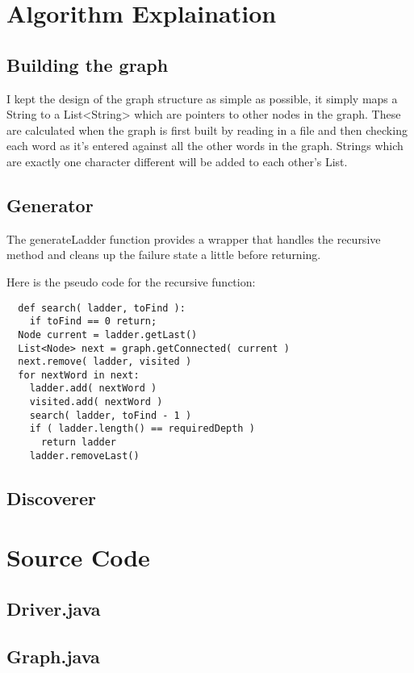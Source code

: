 \documentclass[12pt, titlepage, a4paper, twoside]{article}
\begin{document}
\section*{Algorithm Explaination}

\subsection*{Building the graph}
I kept the design of the graph structure as simple as possible, it simply maps
a String to a List<String> which are pointers to other nodes in the graph. These
are calculated when the graph is first built by reading in a file and then checking
each word as it's entered against all the other words in the graph. Strings which
are exactly one character different will be added to each other's List.

\subsection*{Generator}
The generateLadder function provides a wrapper that handles the recursive method
and cleans up the failure state a little before returning.

Here is the pseudo code for the recursive function:
\begin{verbatim}
  def search( ladder, toFind ):
    if toFind == 0 return;
  Node current = ladder.getLast()
  List<Node> next = graph.getConnected( current )
  next.remove( ladder, visited )
  for nextWord in next:
    ladder.add( nextWord )
    visited.add( nextWord )
    search( ladder, toFind - 1 )
    if ( ladder.length() == requiredDepth )
      return ladder
    ladder.removeLast()
\end{verbatim}

\subsection*{Discoverer}

\newpage
\section*{Source Code}

\subsection*{Driver.java}

\newpage

\subsection*{Graph.java}

\newpage
\end{document}
